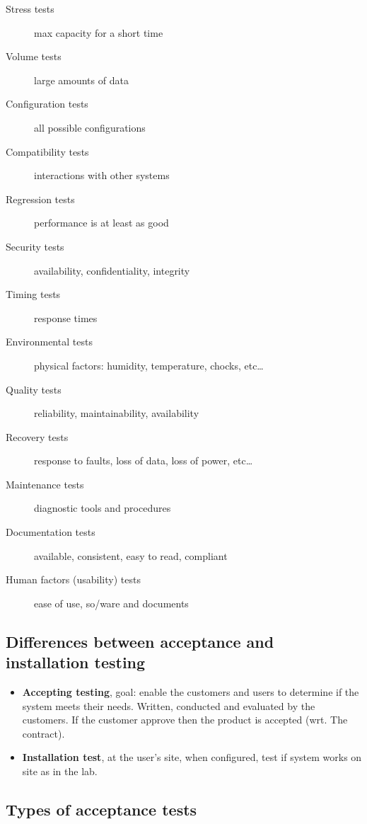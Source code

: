 \begin{description}
    \item[Stress tests] max capacity for a short time
    \item[Volume tests] large amounts of data
    \item[Configuration tests] all possible configurations
    \item[Compatibility tests] interactions with other systems
    \item[Regression tests] performance is at least as good
    \item[Security tests] availability, confidentiality, integrity
    \item[Timing tests] response times
    \item[Environmental tests] physical factors: humidity, temperature, chocks, etc\ldots
    \item[Quality tests] reliability, maintainability, availability
    \item[Recovery tests] response to faults, loss of data, loss of power, etc\ldots
    \item[Maintenance tests] diagnostic tools and procedures
    \item[Documentation tests] available, consistent, easy to read, compliant
    \item[Human factors (usability) tests] ease of use, so/ware and documents
\end{description}

\subsection{Differences between acceptance and installation testing}

\begin{itemize}
    \item \textbf{Accepting testing}, goal: enable the customers and users to determine if the system meets their needs. Written, conducted and evaluated by the customers. If the customer approve then the product is accepted (wrt. The contract). \newline

\item \textbf{Installation test}, at the user’s site, when configured, test if system works on site as in the lab.
\end{itemize}

\subsection{Types of acceptance tests}

